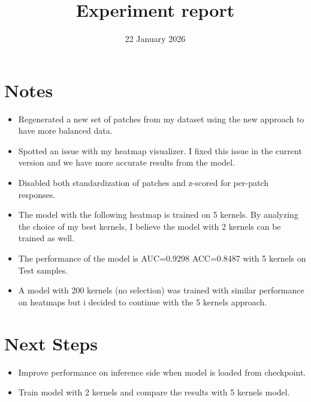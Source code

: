 \documentclass{article}
\begin{document}
\title{Experiment report}
\author{}
\date{22 January 2026}
\maketitle

\section*{Notes}
\begin{itemize}[leftmargin=*]
    \item Regenerated a new set of patches from my dataset using the new approach to have more balanced data.
    \item Spotted an issue with my heatmap visualizer. I fixed this issue in the current version and we have more accurate results from the model.
    \item Disabled both standardization of patches and z-scored for per-patch responses.
    \item The model with the following heatmap is trained on 5 kernels. By analyzing the choice of my best kernels, I believe the model with 2 kernels can be trained as well.
    \item The performance of the model is AUC=0.9298 ACC=0.8487 with 5 kernels on Test samples.
    \item A model with 200 kernels (no selection) was trained with similar performance on heatmaps but i decided to continue with the 5 kernels approach.
\end{itemize}

\section*{Next Steps}
\begin{itemize}[leftmargin=*]
    \item Improve performance on inference side when model is loaded from checkpoint.
    \item Train model with 2 kernels and compare the results with 5 kernels model.
\end{itemize}
\end{document}

